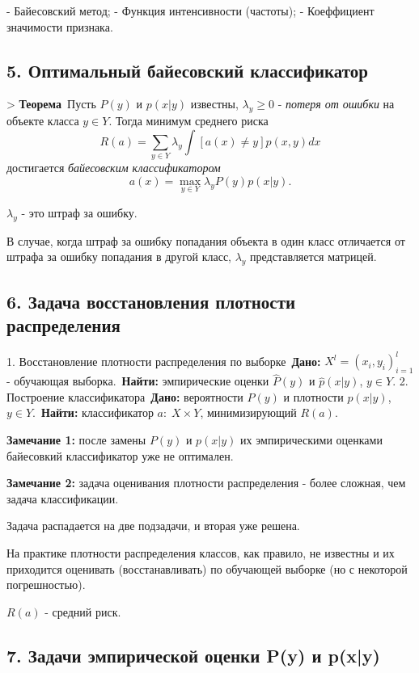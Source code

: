 - Байесовский метод;
- Функция интенсивности (частоты);
- Коеффициент значимости признака.

\subsection{5. Оптимальный байесовский классификатор}

> \textbf{Теорема}\
Пусть $P{(y)}$ и $p{(x \vert y)}$ известны,
$\lambda_y \geqslant 0$ - \textit{потеря от ошибки} на объекте класса $y \in Y$.
Тогда минимум среднего
риска $$\displaystyle R{(a)} = \sum_{y \in Y}{\lambda_{y} \int{{[ a{(x)} \neq y ]} p{(x, y)} dx}}$$
достигается \textit{байесовским классификатором} $$a{(x)} = \max_{y \in Y}{\lambda_y P{(y)} p{(x \vert y)}}.$$

$\lambda_y$ - это штраф за ошибку.

В случае, когда штраф за ошибку попадания объекта в один класс отличается от
штрафа за ошибку попадания в другой класс, $\lambda_y$ представляется
матрицей.

\subsection{6. Задача восстановления плотности распределения}

1. Восстановление плотности распределения по выборке\
\textbf{Дано:} $X^l = {(x_i, y_i)}^{l}_{i=1}$ - обучающая выборка.\
\textbf{Найти:} эмпирические оценки $\hat{P}{(y)}$ и $\hat{p}{(x \vert y)}$,
$y \in Y$.
2. Построение классификатора\
\textbf{Дано:} вероятности $P{(y)}$ и плотности $p{(x \vert y)}$, $y \in Y$.\
\textbf{Найти:} классификатор $a: \; X \times Y$, минимизирующий $R{(a)}$.

\textbf{Замечание 1:} после замены $P{(y)}$ и $p{(x \vert y)}$ их эмпирическими
оценками байесовкий классификатор уже не оптимален.

\textbf{Замечание 2:} задача оценивания плотности распределения - более сложная,
чем задача классификации.

Задача распадается на две подзадачи, и вторая уже решена.

На практике плотности распределения классов, как правило, не известны и их
приходится оценивать (восстанавливать) по обучающей выборке (но с некоторой
погрешностью).

$R{(a)}$ - средний риск.

\subsection{7. Задачи эмпирической оценки P(y) и p(x|y)}

